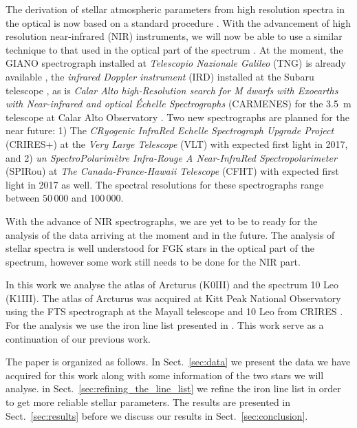 \documentclass{aa}
\begin{document}
The derivation of stellar atmospheric parameters from high resolution spectra in
the optical is now based on a standard procedure
\citep[see e.g.][]{Valenti2005,Sousa2008a}. With the advancement of high
resolution near-infrared (NIR) instruments, we will now be able to use a similar
technique to that used in the optical part of the spectrum
\citep[see e.g.][]{Melendez1999,Sousa2008a,Tsantaki2013,Mucciarelli2013,Bensby2014}.
At the moment, the GIANO spectrograph installed at \emph{Telescopio Nazionale
Galileo} (TNG) is already available \citep{GIANO}, the \emph{infrared Doppler
instrument} (IRD) installed at the Subaru telescope \citep{IRD}, as is
\emph{Calar Alto high-Resolution search for M dwarfs with Exoearths with
Near-infrared and optical Échelle Spectrographs} (CARMENES) for the \SI{3.5}{m}
telescope at Calar Alto Observatory \citep{CARMENES}. Two new spectrographs are
planned for the near future: 1) The \emph{CRyogenic InfraRed Echelle
Spectrograph Upgrade Project} (CRIRES+) at the \emph{Very Large Telescope} (VLT)
\citep{CRIRESp} with expected first light in 2017, and 2) \emph{un
SpectroPolarimètre Infra-Rouge A Near-InfraRed Spectropolarimeter} (SPIRou) at
\emph{The Canada-France-Hawaii Telescope} (CFHT) \citep{SPIROU1,SPIROU2} with
expected first light in 2017 as well. The spectral resolutions for these
spectrographs range between $50\,000$ and $100\,000$.

With the advance of NIR spectrographs, we are yet to be to ready for the
analysis of the data arriving at the moment and in the future. The analysis of
stellar spectra is well understood for FGK stars in the optical part of the
spectrum, however some work still needs to be done for the NIR part.

In this work we analyse the atlas of Arcturus (K0III) and the spectrum 10 Leo
(K1III). The atlas of Arcturus was acquired at Kitt Peak National Observatory
using the FTS spectrograph at the Mayall telescope \citep{Hinkle2003} and 10 Leo
from CRIRES \citep{Nicholls2016}. For the analysis we use the iron line list
presented in \citet{Andreasen2016}. This work serve as a continuation of our
previous work.

The paper is organized as follows. In Sect.~\ref{sec:data} we present the data
we have acquired for this work along with some information of the two stars we
will analyse. in Sect.~\ref{sec:refining_the_line_list} we refine the iron line
list in order to get more reliable stellar parameters. The results are presented
in Sect.~\ref{sec:results} before we discuss our results in
Sect.~\ref{sec:conclusion}.
\end{document}
